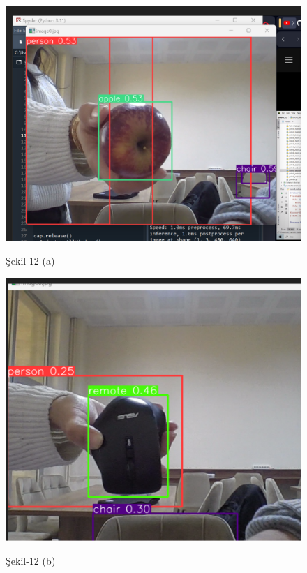 \documentclass[11pt,a4paper]{report}
\begin{document}
	\begin{figure}[!h]
	\centering
	\begin{minipage}{0.45\textwidth} %
		\centering
		\includegraphics[width=\linewidth]{nesne tanıma-1}
		\label{boyutbulma1}
		\caption*{Şekil-12 (a)}
	\end{minipage}%
	\hfill %
	\begin{minipage}{0.45\textwidth} %
		\centering
		\includegraphics[width=\linewidth]{nesne tanıma-2}
		\label{boyutbulma2}
		\caption*{Şekil-12 (b)}
	\end{minipage}
	

\end{figure}
\end{document}
